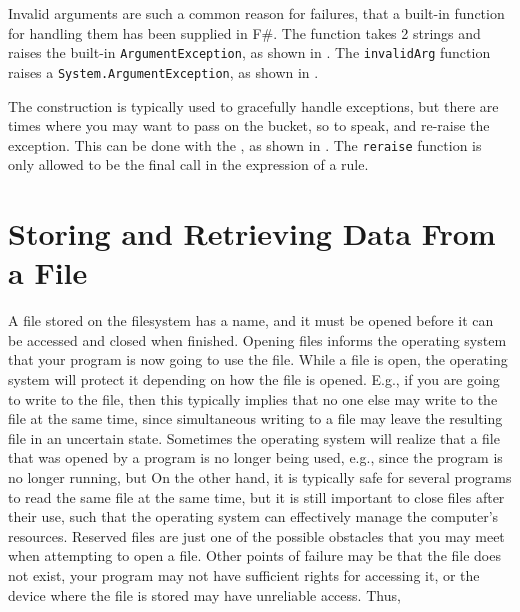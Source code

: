\documentclass[fsharpNotes.tex]{subfiles}
\begin{document}
Invalid arguments are such a common reason for failures, that a built-in function for handling them has been supplied in F\#. The  function takes 2 strings and raises the built-in \lstinline!ArgumentException!, as shown in .
%
%
The \lstinline{invalidArg} function raises a \lstinline{System.ArgumentException}, as shown in .
%
%

The  construction is typically used to gracefully handle exceptions, but there are times where you may want to pass on the bucket, so to speak, and re-raise the exception. This can be done with the , as shown in .
%
%
The \lstinline!reraise! function is only allowed to be the final call in the expression of a  rule.

\section{Storing and Retrieving Data From a File}
A file stored on the filesystem has a name, and it must be opened before it can be accessed and closed when finished. Opening files informs the operating system that your program is now going to use the file. While a file is open, the operating system will protect it depending on how the file is opened. E.g., if you are going to write to the file, then this typically implies that no one else may write to the file at the same time, since simultaneous writing to a file may leave the resulting file in an uncertain state. Sometimes the operating system will realize that a file that was opened by a program is no longer being used, e.g., since the program is no longer running, but  On the other hand, it is typically safe for several programs to read the same file at the same time, but it is still important to close files after their use, such that the operating system can effectively manage the computer's resources. Reserved files are just one of the possible obstacles that you may meet when attempting to open a file. Other points of failure may be that the file does not exist, your program may not have sufficient rights for accessing it, or the device where the file is stored may have unreliable access. Thus, 
\end{document}
